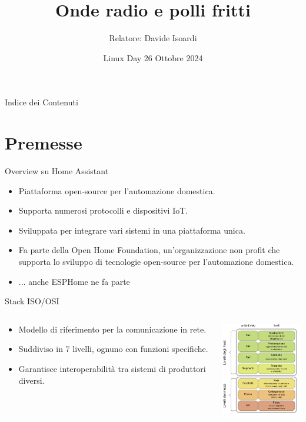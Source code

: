 \documentclass{beamer}
\title{Onde radio e polli fritti}
\author{Relatore: Davide Isoardi}
\date{Linux Day 26 Ottobre 2024}
\begin{document}
	
	\begin{frame}
		\titlepage
	\end{frame}
	
	\begin{frame}{Indice dei Contenuti}
		\tableofcontents
	\end{frame}
	
	\section{Premesse}
	
	\begin{frame}{Overview su Home Assistant}
		\begin{itemize}
			\item Piattaforma open-source per l'automazione domestica.
			\item Supporta numerosi protocolli e dispositivi IoT.
			\item Sviluppata per integrare vari sistemi in una piattaforma unica.
			\item Fa parte della Open Home Foundation, un'organizzazione non profit che supporta lo sviluppo di tecnologie open-source per l'automazione domestica.
			\item ... anche ESPHome ne fa parte
		\end{itemize}
	\end{frame}
	
	\begin{frame}{Stack ISO/OSI}
		\begin{columns}
		\begin{column}{0.5\textwidth}
			\begin{itemize}
				\item Modello di riferimento per la comunicazione in rete.
				\item Suddiviso in 7 livelli, ognuno con funzioni specifiche.
				\item Garantisce interoperabilità tra sistemi di produttori diversi.
			\end{itemize}
		\end{column}
		\begin{column}{0.5\textwidth}
			\includegraphics[width=4cm,angle=45]{images/OSI_Model_Italiano.svg.png}
		\end{column}
		\end{columns}
	\end{frame}
\end{document}
